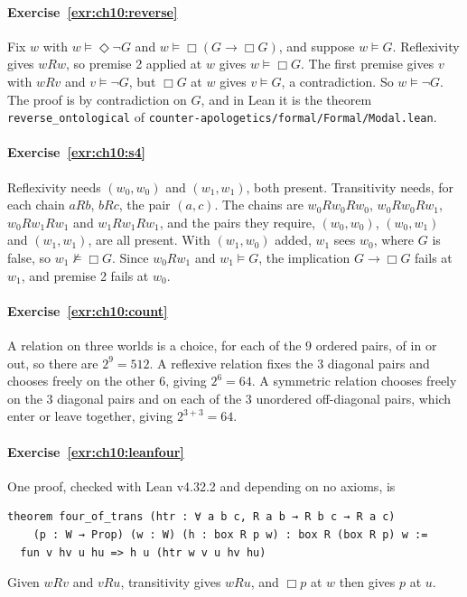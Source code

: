 \paragraph{Exercise~\ref{exr:ch10:reverse}}
Fix $w$ with $w\models\Diamond\neg G$ and $w\models\Box(G\to\Box G)$, and suppose $w\models G$. Reflexivity gives $wRw$, so premise 2 applied at $w$ gives $w\models\Box G$. The first premise gives $v$ with $wRv$ and $v\models\neg G$, but $\Box G$ at $w$ gives $v\models G$, a contradiction. So $w\models\neg G$. The proof is by contradiction on $G$, and in Lean it is the theorem \texttt{reverse\_ontological} of \texttt{counter-apologetics/formal/Formal/Modal.lean}.

\paragraph{Exercise~\ref{exr:ch10:s4}}
Reflexivity needs $(w_0,w_0)$ and $(w_1,w_1)$, both present. Transitivity needs, for each chain $aRb$, $bRc$, the pair $(a,c)$. The chains are $w_0Rw_0Rw_0$, $w_0Rw_0Rw_1$, $w_0Rw_1Rw_1$ and $w_1Rw_1Rw_1$, and the pairs they require, $(w_0,w_0)$, $(w_0,w_1)$ and $(w_1,w_1)$, are all present. With $(w_1,w_0)$ added, $w_1$ sees $w_0$, where $G$ is false, so $w_1\not\models\Box G$. Since $w_0Rw_1$ and $w_1\models G$, the implication $G\to\Box G$ fails at $w_1$, and premise 2 fails at $w_0$.

\paragraph{Exercise~\ref{exr:ch10:count}}
A relation on three worlds is a choice, for each of the $9$ ordered pairs, of in or out, so there are $2^9=512$. A reflexive relation fixes the $3$ diagonal pairs and chooses freely on the other $6$, giving $2^6=64$. A symmetric relation chooses freely on the $3$ diagonal pairs and on each of the $3$ unordered off-diagonal pairs, which enter or leave together, giving $2^{3+3}=64$.

\paragraph{Exercise~\ref{exr:ch10:leanfour}}
One proof, checked with Lean v4.32.2 and depending on no axioms, is
\begin{verbatim}
theorem four_of_trans (htr : ∀ a b c, R a b → R b c → R a c)
    (p : W → Prop) (w : W) (h : box R p w) : box R (box R p) w :=
  fun v hv u hu => h u (htr w v u hv hu)
\end{verbatim}
Given $wRv$ and $vRu$, transitivity gives $wRu$, and $\Box p$ at $w$ then gives $p$ at $u$.
